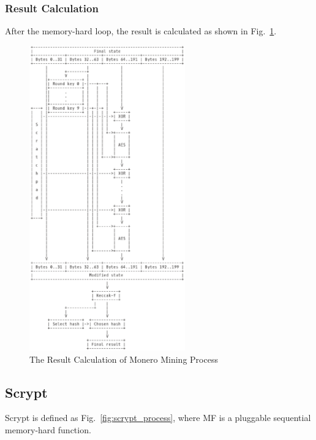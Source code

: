 \documentclass[11pt]{article}
\begin{document}
\subsubsection{Result Calculation}

After the memory-hard loop, the result is calculated as shown in Fig.~\ref{fig:monero_mining_result_calc}.

\begin{figure}[h]
    \centering
    \includegraphics[width=0.6\textwidth]{monero_mining_result_calc.eps}
    \caption{The Result Calculation of Monero Mining Process}
    \label{fig:monero_mining_result_calc}
\end{figure}

\subsection{Scrypt}

Scrypt\cite{percival2016scrypt} is defined as Fig.~\ref{fig:scrypt_process}, where MF is a pluggable sequential memory-hard function.
\end{document}

